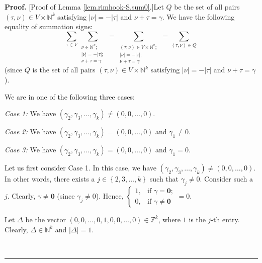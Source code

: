 \documentclass[numbers=enddot,12pt,final,onecolumn,notitlepage]{scrartcl}%
\theoremstyle{definition}
\newenvironment{proof}[1][Proof]{\noindent\textbf{#1.} }{\ \rule{0.5em}{0.5em}}
\let\sumnonlimits\sum
\renewcommand{\sum}{\sumnonlimits\limits}
\begin{document}
\begin{proof}
[Proof of Lemma \ref{lem.rimhook-S.sum0}.]Let $Q$ be the set of all pairs
$\left(  \tau,\nu\right)  \in V\times\mathbb{N}^{k}$ satisfying $\left\vert
\nu\right\vert =-\left\vert \tau\right\vert $ and $\nu+\tau=\gamma$. We have
the following equality of summation signs:%
\begin{equation}
\sum_{\tau\in V}\sum_{\substack{\nu\in\mathbb{N}^{k};\\\left\vert
\nu\right\vert =-\left\vert \tau\right\vert ;\\\nu+\tau=\gamma}}=\sum
_{\substack{\left(  \tau,\nu\right)  \in V\times\mathbb{N}^{k};\\\left\vert
\nu\right\vert =-\left\vert \tau\right\vert ;\\\nu+\tau=\gamma}}=\sum_{\left(
\tau,\nu\right)  \in Q} \label{pf.lem.rimhook-S.sum0.sumeq}%
\end{equation}
(since $Q$ is the set of all pairs $\left(  \tau,\nu\right)  \in
V\times\mathbb{N}^{k}$ satisfying $\left\vert \nu\right\vert =-\left\vert
\tau\right\vert $ and $\nu+\tau=\gamma$).

We are in one of the following three cases:

\textit{Case 1:} We have $\left(  \gamma_{2},\gamma_{3},\ldots,\gamma
_{k}\right)  \neq\left(  0,0,\ldots,0\right)  $.

\textit{Case 2:} We have $\left(  \gamma_{2},\gamma_{3},\ldots,\gamma
_{k}\right)  =\left(  0,0,\ldots,0\right)  $ and $\gamma_{1}\neq0$.

\textit{Case 3:} We have $\left(  \gamma_{2},\gamma_{3},\ldots,\gamma
_{k}\right)  =\left(  0,0,\ldots,0\right)  $ and $\gamma_{1}=0$.

Let us first consider Case 1. In this case, we have $\left(  \gamma_{2}%
,\gamma_{3},\ldots,\gamma_{k}\right)  \neq\left(  0,0,\ldots,0\right)  $. In
other words, there exists a $j\in\left\{  2,3,\ldots,k\right\}  $ such that
$\gamma_{j}\neq0$. Consider such a $j$. Clearly, $\gamma\neq\mathbf{0}$ (since
$\gamma_{j}\neq0$). Hence, $%
\begin{cases}
1, & \text{if }\gamma=\mathbf{0};\\
0, & \text{if }\gamma\neq\mathbf{0}%
\end{cases}
=0$.

Let $\Delta$ be the vector $\left(  0,0,\ldots,0,1,0,0,\ldots,0\right)
\in\mathbb{Z}^{k}$, where $1$ is the $j$-th entry. Clearly, $\Delta
\in\mathbb{N}^{k}$ and $\left\vert \Delta\right\vert =1$.


\end{proof}
\end{document}
